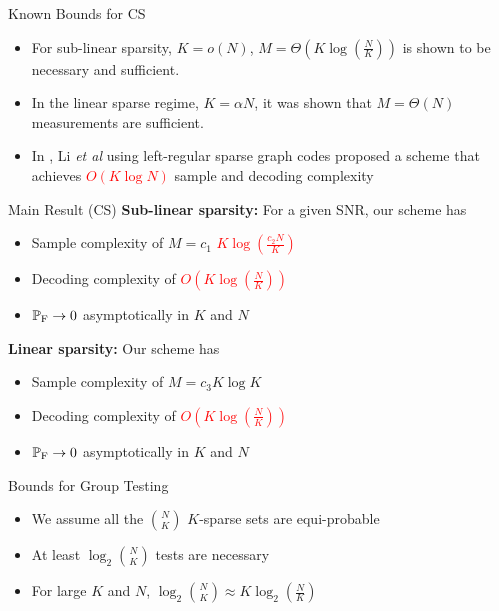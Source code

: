 \documentclass[final]{beamer}
\newlength{\onecolwid}
\newlength{\blockskip}
\newlength{\paraskip}
\begin{document}
\begin{frame}
\begin{columns}[t]
\begin{column}{\onecolwid}
 
    \begin{block}{\Large Known Bounds for CS}
	\begin{itemize}
	 \item For sub-linear sparsity, $K=o(N)$, $M=\Theta\left( K\log(\frac{N}{K	})\right)$ is shown to be necessary and sufficient.
	  \item In the linear sparse regime, $K=\alpha N$, it was shown that $M=\Theta(N)$ measurements are sufficient. 
	  \item In \cite{li2015subisit}, Li \textit{et al} using left-regular sparse graph codes proposed a scheme that achieves \textcolor{red}{$O(K\log N)$} sample and decoding complexity
	 \end{itemize}
	 
   \begin{alertblock}{\Large Main Result (CS)} 
	    \textbf{Sub-linear sparsity: }For a given SNR, our scheme has 
			\begin{itemize}
			\itemsep10pt
				\item Sample complexity of $M=c_1$ \textcolor{red}{$K\log (\frac{c_2 N}{K})$}
				\item Decoding complexity of \textcolor{red}{$O\left(K\log(\frac{N}{K})\right)$} 
				\item $\mathbb{P}_{\text{F}}\rightarrow 0$ asymptotically in $K$ and $N$
			\end{itemize} 
\vspace{\paraskip}    
  
   \textbf{Linear sparsity: }Our scheme has 
		\begin{itemize}
		\itemsep10pt
			\item Sample complexity of $M=c_3 K\log K$
			\item Decoding complexity of \textcolor{red}{$O\left(K\log(\frac{N}{K})\right)$}
			\item $\mathbb{P}_{\text{F}}\rightarrow 0$ asymptotically in $K$ and $N$
		\end{itemize} 
    \end{alertblock}
 \end{block}
  \vspace{\blockskip}   
    
    \begin{block}{\Large Bounds for Group Testing}
		\begin{itemize}
			 \item We assume all the $\binom{N}{K}$ $K$-sparse sets are equi-probable
			 \item At least $\log_2 \binom{N}{K}$ tests are necessary
			 \item For large $K$ and $N$, $\log_2 \binom{N}{K}\approx K\log_2(\frac{N}{K})$
	 \end{itemize}
	 

\end{block}
\end{column}
\end{columns}
\end{frame}
\end{document}
